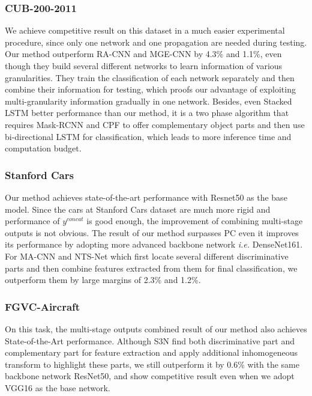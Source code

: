 \documentclass{llncs}
\begin{document}
\subsubsection{CUB-200-2011}



We achieve competitive result on this dataset in a much easier experimental procedure, since only one network and one propagation are needed during testing. Our method outperform RA-CNN\cite{fu2017look} and MGE-CNN \cite{zhang2019learning} by 4.3\% and 1.1\%, even though they build several different networks to learn information of various granularities. They train the classification of each network separately and then combine their information for testing, which proofs our advantage of exploiting multi-granularity information gradually in one network. Besides, even Stacked LSTM \cite{ge2019weakly} better performance than our method, it is a two phase algorithm that requires Mask-RCNN \cite{he2017mask} and CPF to offer complementary object parts and then use bi-directional LSTM \cite{hochreiter1997long} for classification, which leads to more inference time and computation budget.

\subsubsection{Stanford Cars}


Our method achieves state-of-the-art performance with Resnet50 as the base model. Since the cars at Stanford Cars dataset are much more rigid and performance of ${y}^{concat}$ is good enough, the improvement of combining multi-stage outputs is not obvious. The result of our method surpasses PC \cite{dubey2018pairwise} even it improves its performance by adopting more advanced backbone network {\em i.e.} DenseNet161. For MA-CNN \cite{zheng2017learning} and NTS-Net \cite{yang2018learning} which first locate several different discriminative parts and then combine features extracted from them for final classification, we outperform them by large margins of 2.3\% and 1.2\%.

\subsubsection{FGVC-Aircraft}


On this task, the multi-stage outputs combined result of our method also achieves State-of-the-Art performance. Although S3N \cite{ding2019selective} find both discriminative part and complementary part for feature extraction and apply additional inhomogeneous transform to highlight these parts, we still outperform it by 0.6\% with the same backbone network ResNet50, and show competitive result even when we adopt VGG16 as the base network.
\end{document}
